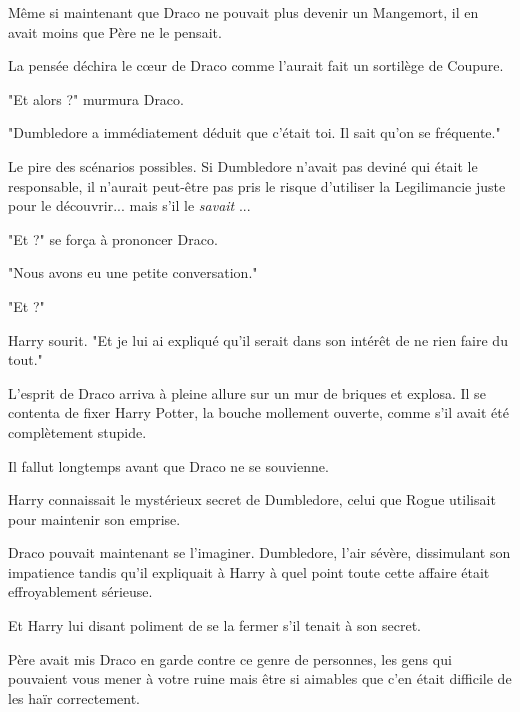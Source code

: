 Même si maintenant que Draco ne pouvait plus devenir un Mangemort, il en avait moins que Père ne le pensait.

La pensée déchira le cœur de Draco comme l'aurait fait un sortilège de Coupure.

"Et alors ?" murmura Draco.

"Dumbledore a immédiatement déduit que c'était toi. Il sait qu'on se fréquente."

Le pire des scénarios possibles. Si Dumbledore n'avait pas deviné qui était le responsable, il n'aurait peut-être pas pris le risque d'utiliser la Legilimancie juste pour le découvrir... mais s'il le \emph{savait} ...

"Et ?" se força à prononcer Draco.

"Nous avons eu une petite conversation."

"Et ?"

Harry sourit. "Et je lui ai expliqué qu'il serait dans son intérêt de ne rien faire du tout."

L'esprit de Draco arriva à pleine allure sur un mur de briques et explosa. Il se contenta de fixer Harry Potter, la bouche mollement ouverte, comme s'il avait été complètement stupide.

Il fallut longtemps avant que Draco ne se souvienne.

Harry connaissait le mystérieux secret de Dumbledore, celui que Rogue utilisait pour maintenir son emprise.

Draco pouvait maintenant se l'imaginer. Dumbledore, l'air sévère, dissimulant son impatience tandis qu'il expliquait à Harry à quel point toute cette affaire était effroyablement sérieuse.

Et Harry lui disant poliment de se la fermer s'il tenait à son secret.

Père avait mis Draco en garde contre ce genre de personnes, les gens qui pouvaient vous mener à votre ruine mais être si aimables que c'en était difficile de les haïr correctement.


